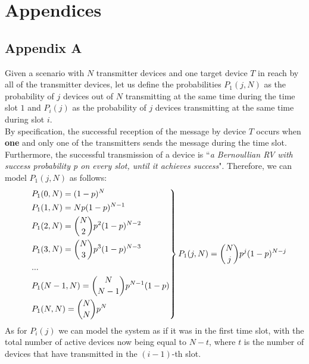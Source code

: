 %
\chapter*{Appendices}
\section*{Appendix A}
\label{app:a}
Given a scenario with $N$ transmitter devices and one target device $T$ in reach
by all of the transmitter devices, let us define the probabilities $P_{1}(j, N)$
as the probability of $j$ devices out of $N$ transmitting at the same time
during the time slot $1$ and $P_{i}(j)$ as the probability of $j$ devices
transmitting at the same time during slot $i$.\\
By specification, the successful reception of the message by device $T$ occurs
when \textbf{one} and only one of the transmitters sends the message during the
time slot. Furthermore, the successful transmission of a device is
``\textit{a Bernoullian RV with success probability \emph{p} on every slot, until
it achieves success}". Therefore, we can model $P_{1}(j, N)$ as follows:
\[
\begin{drcases}
    &P_{1}(0, N) = (1-p)^{N} \\
    &P_{1}(1, N) = N p(1-p)^{N-1}\\
    &P_{1}(2, N) = {N\choose2}p^{2}(1-p)^{N-2}\\
    &P_{1}(3, N) = {N\choose3}p^{3}(1-p)^{N-3}\\
    &...\\
    &P_{1}(N-1, N) = {N\choose N-1}p^{N-1}(1-p)\\
    &P_{1}(N, N) = {N\choose N}p^{N}\\
\end{drcases}
P_{1}(j, N) = {N\choose j} p^{j} (1-p)^{N-j}
\]
As for $P_{i}(j)$ we can model the system as if it was in the first time slot,
with the total number of active devices now being equal to $N - t$, where
$t$ is the number of devices that have transmitted in the $(i - 1)$-th slot.\\

\newpage
